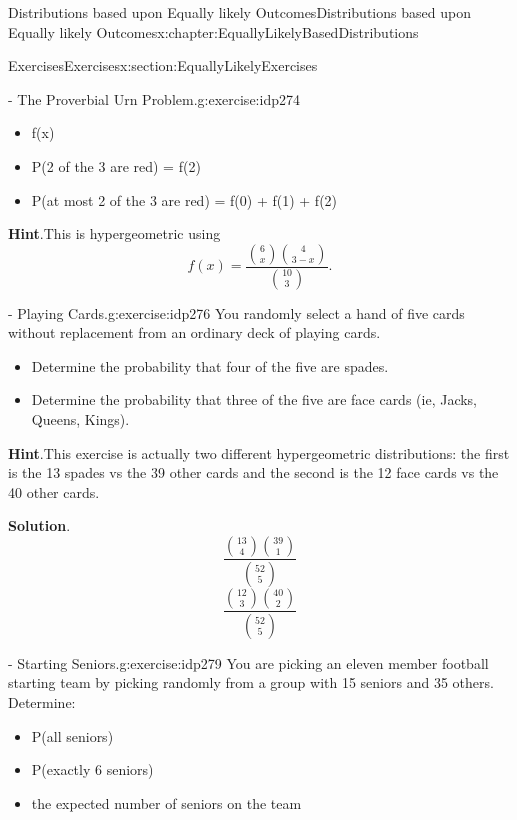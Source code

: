 \documentclass[oneside,10pt,]{book}
\newcommand{\blocktitlefont}{\relax}
\numberwithin{equation}{section}
\begin{document}
\begin{chapterptx}{Distributions based upon Equally likely Outcomes}{}{Distributions based upon Equally likely Outcomes}{}{}{x:chapter:EquallyLikelyBasedDistributions}
\begin{sectionptx}{Exercises}{}{Exercises}{}{}{x:section:EquallyLikelyExercises}
\begin{inlineexercise}{- The Proverbial Urn Problem.}{g:exercise:idp274}
\begin{itemize}[label=\textbullet]
\item{}f(x)%
\item{}P(2 of the 3 are red) = f(2)%
\item{}P(at most 2 of the 3 are red) = f(0) + f(1) + f(2)%
\end{itemize}
%
\par\smallskip%
\noindent\textbf{\blocktitlefont Hint}.\hypertarget{g:hint:idp275}{}\quad{}This is hypergeometric using%
\begin{equation*}
f(x) = \frac{\binom{6}{x} \binom{4}{3-x}}{\binom{10}{3}}.
\end{equation*}
%
\end{inlineexercise}%
\begin{inlineexercise}{- Playing Cards.}{g:exercise:idp276}%
You randomly select a hand of five cards without replacement from an ordinary deck of playing cards.%
\begin{itemize}[label=\textbullet]
\item{}Determine the probability that four of the five are spades.%
\item{}Determine the probability that three of the five are face cards (ie, Jacks, Queens, Kings).%
\end{itemize}
%
\par\smallskip%
\noindent\textbf{\blocktitlefont Hint}.\hypertarget{g:hint:idp277}{}\quad{}This exercise is actually two different hypergeometric distributions: the first is the 13 spades vs the 39 other cards and the second is the 12 face cards vs the 40 other cards.%
\par\smallskip%
\noindent\textbf{\blocktitlefont Solution}.\hypertarget{g:solution:idp278}{}\quad{}%
\begin{equation*}
\frac{\binom{13}{4} \binom{39}{1}}{\binom{52}{5}}
\end{equation*}
%
\begin{equation*}
\frac{\binom{12}{3} \binom{40}{2}}{\binom{52}{5}}
\end{equation*}
%
\end{inlineexercise}%
\begin{inlineexercise}{- Starting Seniors.}{g:exercise:idp279}%
You are picking an eleven member football starting team by picking randomly from a group with 15 seniors and 35 others. Determine:%
\begin{itemize}[label=\textbullet]
\item{}P(all seniors)%
\item{}P(exactly 6 seniors)%
\item{}the expected number of seniors on the team%

\end{itemize}
\end{inlineexercise}
\end{sectionptx}
\end{chapterptx}
\end{document}
